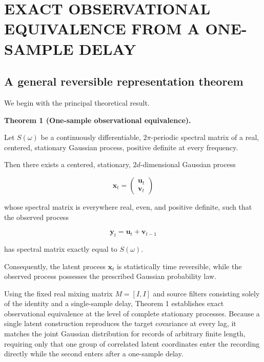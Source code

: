 \documentclass[aps,pre,reprint,amsmath,amssymb,superscriptaddress]{revtex4-2}
\begin{document}
\section{EXACT OBSERVATIONAL EQUIVALENCE FROM A ONE-SAMPLE DELAY}

\subsection{A general reversible representation theorem}

We begin with the principal theoretical result.

\textbf{Theorem 1 (One-sample observational equivalence).}

Let \(S(\omega)\) be a continuously differentiable, \(2\pi\)-periodic spectral matrix of a real, centered, stationary Gaussian process, positive definite at every frequency.

Then there exists a centered, stationary, \(2d\)-dimensional Gaussian process

\[
\mathbf x_t=
\begin{pmatrix}
\mathbf u_t\\
\mathbf v_t
\end{pmatrix}
\]

whose spectral matrix is everywhere real, even, and positive definite, such that the observed process

\begin{equation}\label{eq:6}
\boxed{
\mathbf y_t=\mathbf u_t+\mathbf v_{t-1}
}
\end{equation}

has spectral matrix exactly equal to \(S(\omega)\).

Consequently, the latent process \(\mathbf x_t\) is statistically time reversible, while the observed process possesses the prescribed Gaussian probability law.

Using the fixed real mixing matrix $M = [I, I]$ and source filters consisting solely of the identity and a single-sample delay, Theorem 1 establishes exact observational equivalence at the level of complete stationary processes. Because a single latent construction reproduces the target covariance at every lag, it matches the joint Gaussian distribution for records of arbitrary finite length, requiring only that one group of correlated latent coordinates enter the recording directly while the second enters after a one-sample delay.
\end{document}
